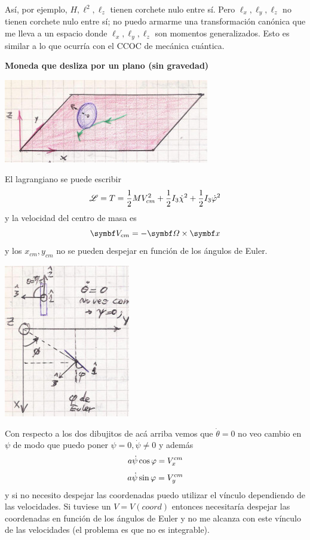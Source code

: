 \documentclass[10pt,oneside]{CBFT_book}
\begin{document}
Así, por ejemplo, $H,\ell^2, \ell_z$ tienen corchete nulo entre sí. Pero $\ell_x, \ell_y, \ell_z$ no tienen corchete nulo
entre sí; no puedo armarme una transformación canónica que me lleva a un espacio donde $\ell_x, \ell_y, \ell_z$ son
momentos generalizados.
Esto es similar a lo que ocurría con el CCOC de mecánica cuántica.


\begin{ejemplo}{\bf Moneda que desliza por un plano (sin gravedad)}


\includegraphics[scale=0.4]{images/fig_mc_moneda_dos_1.jpg}

El lagrangiano se puede escribir
\[
	\mathscr{L} = T = \frac 1 2 M V_{cm}^2 + \frac 1 2 I_3 \dot{\chi}^2 + \frac 1 2 I_3 \dot{\varphi}^2
\]
y la velocidad del centro de masa es
\[
	\vb{V}_{cm} = - \vb{\Omega} \times \vb{x}
\]
y los $x_{cm}, y_{cm}$ no se pueden despejar en función de los ángulos de Euler.

\includegraphics[scale=0.4]{images/fig_mc_moneda_dos_2.jpg}

Con respecto a los dos dibujitos de acá arriba vemos que $\dot{\theta} = 0$ no veo cambio en $\psi$ de modo que 
puedo poner $\psi = 0, \dot{\psi} \neq 0$ y además
\[
	a \dot{\psi} \cos \varphi = V_x^{cm}
\]
\[
	a \dot{\psi} \sin \varphi = V_y^{cm}
\]
y si no necesito despejar las coordenadas puedo utilizar el vínculo dependiendo de las velocidades. Si tuviese
un $V=V(coord)$ entonces necesitaría despejar las coordenadas en función de los ángulos de Euler y no me alcanza
con este vínculo de las velocidades (el problema es que no es integrable).


\end{ejemplo}
\end{document}
